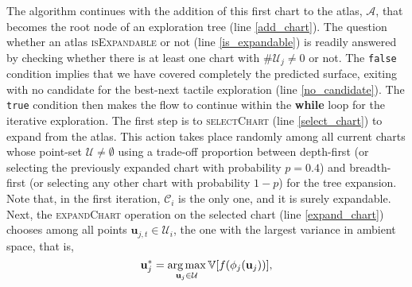 The algorithm continues with the addition of this first chart to the atlas, $\mathcal{A}$, that becomes the root node of an exploration tree (line \ref{add_chart}). The question whether an atlas \textsc{isExpandable} or not (line \ref{is_expandable}) is readily answered by checking whether there is at least one chart with $\#\mathcal{U}_j \neq 0$ or not. The \texttt{false} condition implies that we have covered completely the predicted surface, exiting with no candidate for the best-next tactile exploration (line \ref{no_candidate}). The \texttt{true} condition then makes the flow to continue within the \textbf{while} loop for the iterative exploration. The first step is to \textsc{selectChart} (line \ref{select_chart}) to expand from the atlas. This action takes place randomly among all current charts whose point-set $\mathcal{U} \neq \emptyset$ using a trade-off proportion between depth-first (or selecting the previously expanded chart with probability $p = 0.4$) and breadth-first (or selecting any other chart with probability $1-p$) for the tree expansion. Note that, in the first iteration, $\mathcal{C}_i$ is the only one, and it is surely expandable. Next, the \textsc{expandChart} operation on the selected chart (line \ref{expand_chart}) chooses among all points $\mathbf{u}_{j,t} \in \mathcal{U}_i$, the one with the largest variance in ambient space, that is,
\begin{equation}
\mathbf{u}_{j}^* =  \operatorname*{arg\,max}_{\mathbf{u}_{j} \in \mathcal{U}} \mathbb{V}[f(\phi_j(\mathbf{u}_{j}))], 
\end{equation}
